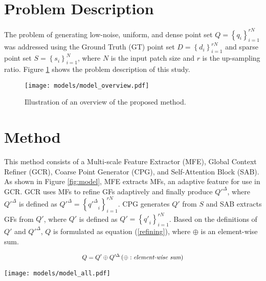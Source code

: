 \documentclass{article}
\begin{document}
\section{Problem Description}
\label{sec:problem_description}
\quad The problem of generating low-noise, uniform, and dense point set $Q = \left\{q_{i} \right\}_{i = 1}^{rN}$ was addressed using the Ground Truth (GT) point set $D = \left\{d_{i} \right\}_{i = 1}^{rN}$ and sparse point set $S = \left\{s_{i} \right\}_{i = 1}^{N}$, where $N$ is the input patch size and $r$ is the up-sampling ratio. Figure \ref{fig:overview} shows the problem description of this study.


\begin{figure}[htb!]
  \centering  \texttt{[image: models/model\_overview.pdf]}
  \caption{Illustration of an overview of the proposed method.}
  \label{fig:overview}
\end{figure}

\section{Method}
\label{sec:method}
\quad This method consists of a Multi-scale Feature Extractor (MFE), Global Context Refiner (GCR), Coarse Point Generator (CPG), and Self-Attention Block (SAB). As shown in Figure \ref{fig:model}, MFE extracts MFs, an adaptive feature for use in GCR. GCR uses MFs to refine GFs adaptively and finally produce $Q'^{\Delta}$, where $Q'^{\Delta}$ is defined as $\mathit{Q'^{\Delta}} = \left\{\mathit{q'^{\Delta}}_{i} \right\}_{i = 1}^{rN}$. CPG generates $Q'$ from $S$ and SAB extracts GFs from $Q'$, where $Q'$ is defined as $\mathit{Q'} = \left\{\mathit{q'}_{i} \right\}_{i = 1}^{rN}$. Based on the definitions of $Q'$ and $\mathit{Q'^{\Delta}}$, $Q$ is formulated as equation (\ref{refining}), where $\oplus$ is an element-wise sum.
\begin{center}
\begin{equation}\label{refining}
\scalebox{0.87}{$\begin{aligned}
    Q=Q'\oplus Q'^{\Delta} \left (\oplus:\textit{element-wise sum}\right )
\end{aligned}$}
\end{equation}
\end{center}

\begin{figure*}[htb!]
  \centering
  \texttt{[image: models/model\_all.pdf]}
  \caption{Illustration of the proposed framework. Here, 3 is the coordinate dimension, and $H$ is the depth of the layer. In Multi-scale Feature Extractor (MFE) and Global Context Refiner (GCR), $C$ is the channel, and $K$ is the expansion ratio. In Coarse Point Generator (CPG) and Self-Attention Block (SAB), $C’$ is the channel and $K'$ is the expansion ratio.}
  \label{fig:model}
\end{figure*}
\end{document}
